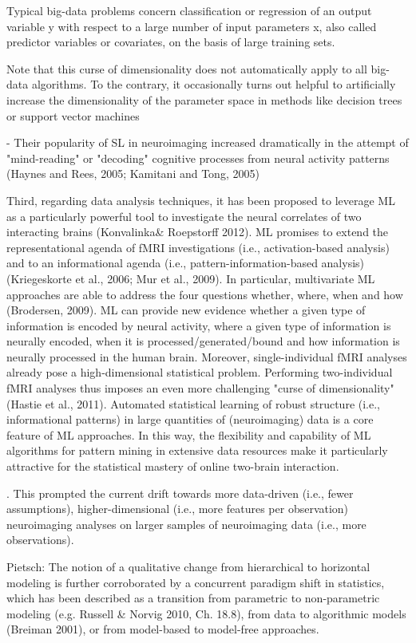 \documentclass[authoryear,review,3p]{elsarticle}
\begin{document}
Typical big-data problems concern classification or regression of an output variable y with respect to a large number of input parameters x, also called predictor variables or covariates, on the basis of large training sets. 


Note that this curse of dimensionality does not automatically apply to all big-data algorithms. To the contrary, it occasionally turns out helpful to artificially increase the dimensionality of the parameter space in methods like decision trees or support vector machines 

- Their popularity of SL in neuroimaging increased dramatically in the attempt of "mind-reading" or "decoding" cognitive processes from neural activity patterns (Haynes and Rees, 2005; Kamitani and Tong, 2005)


Third, regarding data analysis techniques, it has been proposed to leverage ML as a particularly powerful tool to investigate the neural correlates of two interacting brains (Konvalinka\& Roepstorff 2012). ML promises to extend the representational agenda of fMRI investigations (i.e., activation-based analysis) and to an informational agenda (i.e., pattern-information-based analysis) (Kriegeskorte et al., 2006; Mur et al., 2009). In particular, multivariate ML approaches are able to address the four questions whether, where, when and how (Brodersen, 2009). ML can provide new evidence whether a given type of information is encoded by neural activity, where a given type of information is neurally encoded, when it is processed/generated/bound and how information is neurally processed in the human brain. Moreover, single-individual fMRI analyses already pose a high-dimensional statistical problem. Performing two-individual fMRI analyses thus imposes an even more challenging "curse of dimensionality" (Hastie et al., 2011). Automated statistical learning of robust structure (i.e., informational patterns) in large quantities of (neuroimaging) data is a core feature of ML approaches. In this way, the flexibility and capability of ML algorithms for pattern mining in extensive data resources make it particularly attractive for the statistical mastery of online two-brain interaction.

. This prompted the current drift towards more data-driven (i.e., fewer assumptions), higher-dimensional (i.e., more features per observation) neuroimaging analyses on larger samples of neuroimaging data (i.e., more observations).


Pietsch:
The notion of a qualitative change from hierarchical to horizontal modeling is further corroborated by a concurrent paradigm shift in statistics, which has been described as a transition from parametric to non-parametric modeling (e.g. Russell \& Norvig 2010, Ch. 18.8), from data to algorithmic models (Breiman 2001), or from model-based to model-free approaches.
\end{document}
